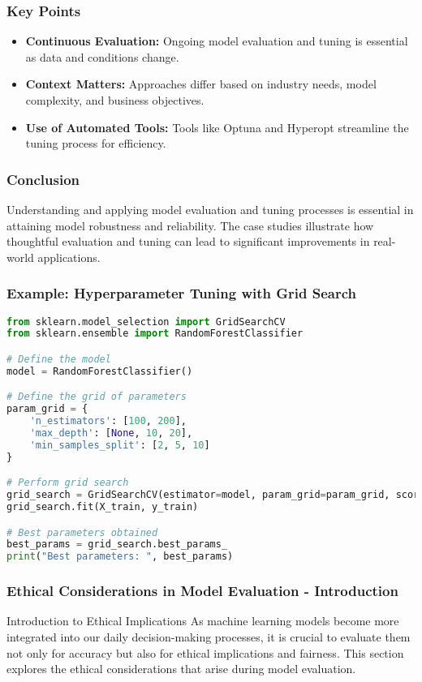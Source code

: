 \documentclass[aspectratio=169]{beamer}
\begin{document}
\begin{frame}[fragile]
    \frametitle{Key Points}
    \begin{itemize}
        \item \textbf{Continuous Evaluation:} Ongoing model evaluation and tuning is essential as data and conditions change.
        \item \textbf{Context Matters:} Approaches differ based on industry needs, model complexity, and business objectives.
        \item \textbf{Use of Automated Tools:} Tools like Optuna and Hyperopt streamline the tuning process for efficiency.
    \end{itemize}
\end{frame}

\begin{frame}[fragile]
    \frametitle{Conclusion}
    Understanding and applying model evaluation and tuning processes is essential in attaining model robustness and reliability. The case studies illustrate how thoughtful evaluation and tuning can lead to significant improvements in real-world applications.
\end{frame}

\begin{frame}[fragile]
    \frametitle{Example: Hyperparameter Tuning with Grid Search}
    \begin{lstlisting}[language=Python]
from sklearn.model_selection import GridSearchCV
from sklearn.ensemble import RandomForestClassifier

# Define the model
model = RandomForestClassifier()

# Define the grid of parameters
param_grid = {
    'n_estimators': [100, 200],
    'max_depth': [None, 10, 20],
    'min_samples_split': [2, 5, 10]
}

# Perform grid search
grid_search = GridSearchCV(estimator=model, param_grid=param_grid, scoring='accuracy', cv=5)
grid_search.fit(X_train, y_train)

# Best parameters obtained
best_params = grid_search.best_params_
print("Best parameters: ", best_params)
    \end{lstlisting}
\end{frame}

\begin{frame}[fragile]
    \frametitle{Ethical Considerations in Model Evaluation - Introduction}
    \begin{block}{Introduction to Ethical Implications}
        As machine learning models become more integrated into our daily decision-making processes, it is crucial to evaluate them not only for accuracy but also for ethical implications and fairness. This section explores the ethical considerations that arise during model evaluation.
    \end{block}
\end{frame}
\end{document}

